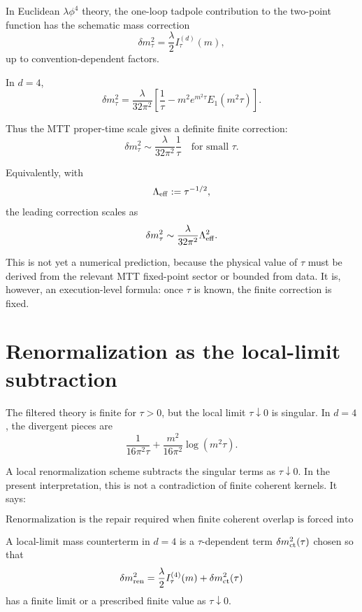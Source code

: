 \documentclass[11pt]{article}
\begin{document}
In Euclidean \(\lambda\phi^4\) theory, the one-loop tadpole contribution to the two-point function has the schematic mass correction
\[
\delta m_\tau^2
=
\frac{\lambda}{2} I_\tau^{(d)}(m),
\]
up to convention-dependent factors.

In \(d=4\),
\[
\delta m_\tau^2
=
\frac{\lambda}{32\pi^2}
\left[
\frac{1}{\tau}
-
m^2e^{m^2\tau}E_1(m^2\tau)
\right].
\]

Thus the MTT proper-time scale gives a definite finite correction:
\[
\boxed{
\delta m_\tau^2
\sim
\frac{\lambda}{32\pi^2}\frac{1}{\tau}
\quad
\text{for small }\tau.
}
\]

Equivalently, with
\[
\Lambda_{\rm eff}:=\tau^{-1/2},
\]
the leading correction scales as
\[
\delta m_\tau^2
\sim
\frac{\lambda}{32\pi^2}\Lambda_{\rm eff}^2.
\]

\begin{remark}
This is not yet a numerical prediction, because the physical value of \(\tau\) must be derived from the relevant MTT fixed-point sector or bounded from data. It is, however, an execution-level formula: once \(\tau\) is known, the finite correction is fixed.
\end{remark}

\section{Renormalization as the local-limit subtraction}

The filtered theory is finite for \(\tau>0\), but the local limit \(\tau\downarrow0\) is singular. In \(d=4\), the divergent pieces are
\[
\frac{1}{16\pi^2\tau}
+
\frac{m^2}{16\pi^2}\log(m^2\tau).
\]

A local renormalization scheme subtracts the singular terms as \(\tau\downarrow0\). In the present interpretation, this is not a contradiction of finite coherent kernels. It says:

\[
\boxed{
\text{Renormalization is the repair required when finite coherent overlap is forced into the zero-width local limit.}
}
\]

\begin{definition}
A local-limit mass counterterm in \(d=4\) is a \(\tau\)-dependent term \(\delta m_{\rm ct}^2(\tau)\) chosen so that
\[
\delta m_{\rm ren}^2
=
\frac{\lambda}{2}I_\tau^{(4)}(m)
+
\delta m_{\rm ct}^2(\tau)
\]
has a finite limit or a prescribed finite value as \(\tau\downarrow0\).
\end{definition}
\end{document}

